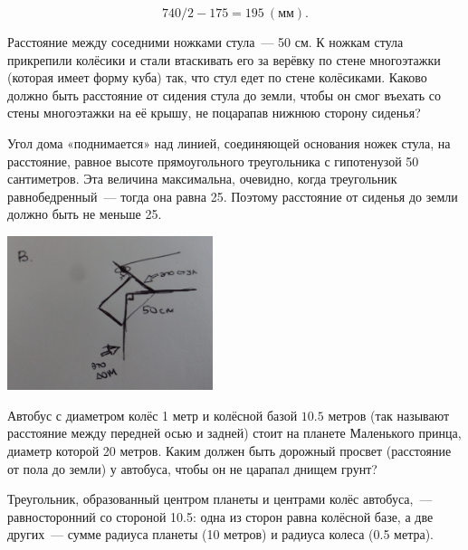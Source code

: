 \begin{itemize}

\itA $$740/2-175 = \SI{195}{(\text{мм})}.$$

\itB Расстояние между соседними ножками стула~— 50 см. К ножкам стула прикрепили колёсики и стали втаскивать его за верёвку по стене многоэтажки (которая имеет форму куба) так, что стул едет по стене колёсиками. Каково должно быть расстояние от сидения стула до земли, чтобы он смог въехать со стены многоэтажки на её крышу, не поцарапав нижнюю сторону сиденья?

Угол дома «поднимается» над линией, соединяющей основания ножек стула, на расстояние, равное высоте прямоугольного треугольника с гипотенузой 50 сантиметров. Эта величина максимальна, очевидно, когда треугольник равнобедренный~— тогда она равна \SI{25}{}. Поэтому расстояние от сиденья до земли должно быть не меньше \SI{25}{}.

\begin{center}
	\includegraphics[natwidth=3513,natheight=2640,width=6cm]{figures/2018-clearances-b}
\end{center}

\itC Автобус с диаметром колёс 1 метр и колёсной базой $10.5$ метров (так называют расстояние между передней осью и задней) стоит на планете Маленького принца, диаметр которой 20 метров. Каким должен быть дорожный просвет (расстояние от пола до земли) у автобуса, чтобы он не царапал днищем грунт?

Треугольник, образованный центром планеты и центрами колёс автобуса,~— равносторонний со стороной \SI{10.5}{}: одна из сторон равна колёсной базе, а две других~— сумме радиуса планеты (10 метров) и радиуса колеса (0.5 метра).

\begin{center}
\end{center}


\end{itemize}
